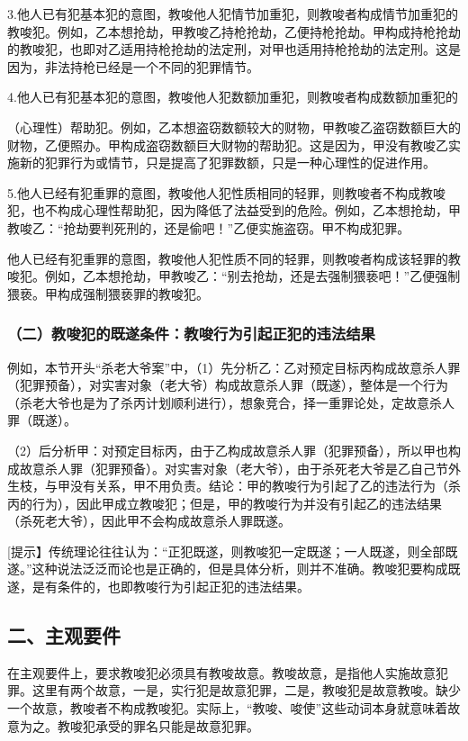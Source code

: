 3.他人已有犯基本犯的意图，教唆他人犯情节加重犯，则教唆者构成情节加重犯的教唆犯。例如，乙本想抢劫，甲教唆乙持枪抢劫，乙便持枪抢劫。甲构成持枪抢劫的教唆犯，也即对乙适用持枪抢劫的法定刑，对甲也适用持枪抢劫的法定刑。这是因为，非法持枪已经是一个不同的犯罪情节。

4.他人已有犯基本犯的意图，教唆他人犯数额加重犯，则教唆者构成数额加重犯的

（心理性）帮助犯。例如，乙本想盗窃数额较大的财物，甲教唆乙盗窃数额巨大的财物，乙便照办。甲构成盗窃数额巨大财物的帮助犯。这是因为，甲没有教唆乙实施新的犯罪行为或情节，只是提高了犯罪数额，只是一种心理性的促进作用。

5.他人已经有犯重罪的意图，教唆他人犯性质相同的轻罪，则教唆者不构成教唆犯，也不构成心理性帮助犯，因为降低了法益受到的危险。例如，乙本想抢劫，甲教唆乙：“抢劫要判死刑的，还是偷吧！”乙便实施盗窃。甲不构成犯罪。

他人已经有犯重罪的意图，教唆他人犯性质不同的轻罪，则教唆者构成该轻罪的教唆犯。例如，乙本想抢劫，甲教唆乙：“别去抢劫，还是去强制猥亵吧！”乙便强制猥亵。甲构成强制猥亵罪的教唆犯。

\subsubsection*{（二）教唆犯的既遂条件：教唆行为引起正犯的违法结果}

例如，本节开头“杀老大爷案”中，（1）先分析乙：乙对预定目标丙构成故意杀人罪（犯罪预备），对实害对象（老大爷）构成故意杀人罪（既遂），整体是一个行为（杀老大爷也是为了杀丙计划顺利进行），想象竞合，择一重罪论处，定故意杀人罪（既遂）。

（2）后分析甲：对预定目标丙，由于乙构成故意杀人罪（犯罪预备），所以甲也构成故意杀人罪（犯罪预备）。对实害对象（老大爷），由于杀死老大爷是乙自己节外生枝，与甲没有关系，甲不用负责。结论：甲的教唆行为引起了乙的违法行为（杀丙的行为），因此甲成立教唆犯；但是，甲的教唆行为并没有引起乙的违法结果（杀死老大爷），因此甲不会构成故意杀人罪既遂。

[提示】传统理论往往认为：“正犯既遂，则教唆犯一定既遂；一人既遂，则全部既遂。”这种说法泛泛而论也是正确的，但是具体分析，则并不准确。教唆犯要构成既遂，是有条件的，也即教唆行为引起正犯的违法结果。

\subsection*{二、主观要件}

在主观要件上，要求教唆犯必须具有教唆故意。教唆故意，是指他人实施故意犯罪。这里有两个故意，一是，实行犯是故意犯罪，二是，教唆犯是故意教唆。缺少一个故意，教唆者不构成教唆犯。实际上，“教唆、唆使”这些动词本身就意味着故意为之。教唆犯承受的罪名只能是故意犯罪。

